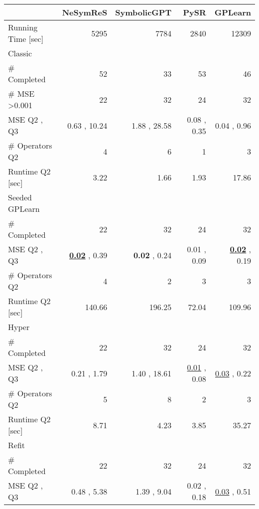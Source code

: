 \begin{tabularx}{\textwidth}{lRRRR}
\toprule
  &  NeSymReS  &  SymbolicGPT  &  PySR  &  GPLearn  \\ 
\midrule
Running Time [sec]  &  5295  &  7784  &  2840  &  12309  \\ 
Classic  &     &     &     &     \\ 
\qquad  \# Completed  &  52\phantom{.00}  &  33\phantom{.00}  &  53\phantom{.00}  &  46\phantom{.00}  \\ 
\qquad  \# MSE >0.001  &  22\phantom{.00}  &  32\phantom{.00}  &  24\phantom{.00}  &  32\phantom{.00}  \\ 
\qquad MSE Q2 ,  Q3  &  0.63  ,  10.24  &  1.88  ,  28.58  &  0.08  ,  0.35  &  0.04  ,  0.96  \\ 
\qquad \# Operators Q2  &  4\phantom{.00}  &  6\phantom{.00}  &  1\phantom{.00}  &  3\phantom{.00}  \\ 
\qquad Runtime Q2 [sec]  &  3.22  &  1.66  &  1.93  &  17.86  \\ 
Seeded GPLearn  &     &     &     &     \\ 
\qquad  \# Completed  &  22\phantom{.00}  &  32\phantom{.00}  &  24\phantom{.00}  &  32\phantom{.00}  \\ 
\qquad MSE Q2 ,  Q3  &  \underline{\textbf{0.02}}  ,  0.39  &  \textbf{0.02}  ,  0.24  &  0.01  ,  0.09  &  \underline{\textbf{0.02}}  ,  0.19  \\ 
\qquad \# Operators Q2  &  4\phantom{.00}  &  2\phantom{.00}  &  3\phantom{.00}  &  3\phantom{.00}  \\ 
\qquad Runtime Q2 [sec]  &  140.66  &  196.25  &  72.04  &  109.96  \\ 
Hyper  &     &     &     &     \\ 
\qquad  \# Completed  &  22\phantom{.00}  &  32\phantom{.00}  &  24\phantom{.00}  &  32\phantom{.00}  \\ 
\qquad MSE Q2 ,  Q3  &  0.21  ,  1.79  &  1.40  ,  18.61  &  \underline{0.01}  ,  0.08  &  \underline{0.03}  ,  0.22  \\ 
\qquad \# Operators Q2  &  5\phantom{.00}  &  8\phantom{.00}  &  2\phantom{.00}  &  3\phantom{.00}  \\ 
\qquad Runtime Q2 [sec]  &  8.71  &  4.23  &  3.85  &  35.27  \\ 
Refit  &     &     &     &     \\ 
\qquad  \# Completed  &  22\phantom{.00}  &  32\phantom{.00}  &  24\phantom{.00}  &  32\phantom{.00}  \\ 
\qquad MSE Q2 ,  Q3  &  0.48  ,  5.38  &  1.39  ,  9.04  &  0.02  ,  0.18  &  \underline{0.03}  ,  0.51  \\ 

\end{tabularx}
